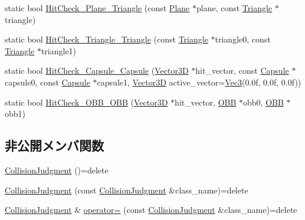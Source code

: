 \begin{DoxyCompactItemize}
static bool \mbox{\hyperlink{class_collision_judgment_a473c94087dc9cd3937016ccba5f12abd}{Hit\+Check\+\_\+\+Plane\+\_\+\+Triangle}} (const \mbox{\hyperlink{class_plane}{Plane}} $\ast$plane, const \mbox{\hyperlink{class_triangle}{Triangle}} $\ast$triangle)
\item 
static bool \mbox{\hyperlink{class_collision_judgment_ab33b8936e62bdb9b6cf6f3d383c033b9}{Hit\+Check\+\_\+\+Triangle\+\_\+\+Triangle}} (const \mbox{\hyperlink{class_triangle}{Triangle}} $\ast$triangle0, const \mbox{\hyperlink{class_triangle}{Triangle}} $\ast$triangle1)
\item 
static bool \mbox{\hyperlink{class_collision_judgment_a95962556f370a964ec1961b1c461ae2a}{Hit\+Check\+\_\+\+Capsule\+\_\+\+Capsule}} (\mbox{\hyperlink{class_vector3_d}{Vector3D}} $\ast$hit\+\_\+vector, const \mbox{\hyperlink{class_capsule}{Capsule}} $\ast$capsule0, const \mbox{\hyperlink{class_capsule}{Capsule}} $\ast$capsule1, \mbox{\hyperlink{class_vector3_d}{Vector3D}} active\+\_\+vector=\mbox{\hyperlink{_vector3_d_8h_ab16f59e4393f29a01ec8b9bbbabbe65d}{Vec3}}(0.\+0f, 0.\+0f, 0.\+0f))
\item 
static bool \mbox{\hyperlink{class_collision_judgment_a3c0a99feef4531370096d458aefa8941}{Hit\+Check\+\_\+\+O\+B\+B\+\_\+\+O\+BB}} (\mbox{\hyperlink{class_vector3_d}{Vector3D}} $\ast$hit\+\_\+vector, \mbox{\hyperlink{class_o_b_b}{O\+BB}} $\ast$obb0, \mbox{\hyperlink{class_o_b_b}{O\+BB}} $\ast$obb1)
\end{DoxyCompactItemize}
\subsection*{非公開メンバ関数}
\begin{DoxyCompactItemize}
\item 
\mbox{\hyperlink{class_collision_judgment_a9dc2db0e4f4373d85c070f96c97e6003}{Collision\+Judgment}} ()=delete
\item 
\mbox{\hyperlink{class_collision_judgment_af49c808becf4f2813aef32257865e6a4}{Collision\+Judgment}} (const \mbox{\hyperlink{class_collision_judgment}{Collision\+Judgment}} \&class\+\_\+name)=delete
\item 
\mbox{\hyperlink{class_collision_judgment}{Collision\+Judgment}} \& \mbox{\hyperlink{class_collision_judgment_a240135a0a865032c624fd0b364b1a400}{operator=}} (const \mbox{\hyperlink{class_collision_judgment}{Collision\+Judgment}} \&class\+\_\+name)=delete
\end{DoxyCompactItemize}
